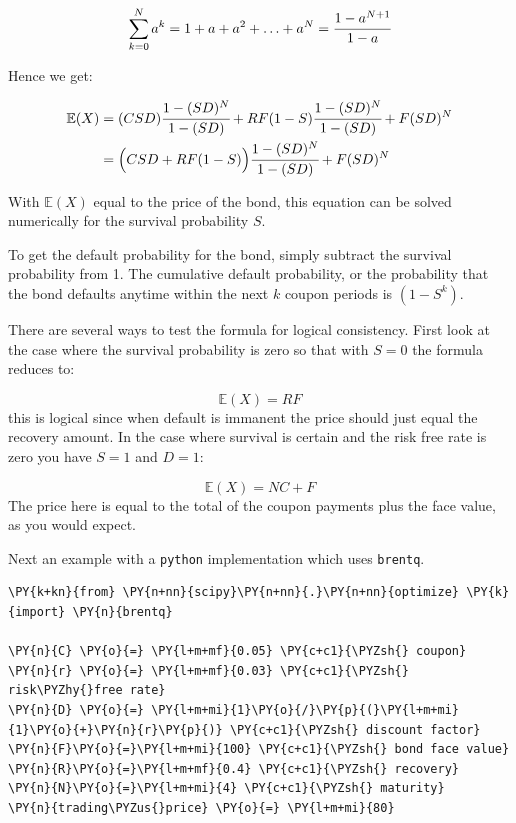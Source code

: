 \begin{attention}
\begin{equation}\sum_{k=0}^N a^k = 1 + a + a^2 + \ldots + a^N = \cfrac{1-a^{N+1}}{1-a} \end{equation}

Hence we get:

\begin{align}
\begin{split}
\mathbb{E}(X) &= (CSD) \cfrac{1-(SD)^N}{1-(SD)}+RF(1-S)\cfrac{1-(SD)^N}{1-(SD)} + F(SD)^N \\
&= \Big(CSD + RF(1-S)\Big)\cfrac{1-(SD)^N}{1-(SD)} + F(SD)^N 
\end{split}
\end{align}

With $\mathbb{E}(X)$ equal to the price of the bond, this equation can be solved numerically for the survival probability $S$.

To get the default probability for the bond, simply subtract the survival
probability from 1. The cumulative default probability, or the probability that the bond defaults anytime within the next $k$ coupon periods is $(1 - S^k)$.

There are several ways to test the formula for logical consistency. First look
at the case where the survival probability is zero so that with $S = 0$ the
formula reduces to:

\begin{equation}\mathbb{E}(X) = RF\end{equation}
this is logical since when default is immanent the price should just equal the
recovery amount.
In the case where survival is certain and the risk free rate is zero you have
$S = 1$ and $D=1$:

\begin{equation}\mathbb{E}(X) = NC + F \end{equation}
The price here is equal to the total of the coupon payments plus the face
value, as you would expect.

Next an example with a \texttt{python} implementation which uses \texttt{brentq}.

\begin{Verbatim}[commandchars=\\\{\}]
\PY{k+kn}{from} \PY{n+nn}{scipy}\PY{n+nn}{.}\PY{n+nn}{optimize} \PY{k}{import} \PY{n}{brentq}
	
\PY{n}{C} \PY{o}{=} \PY{l+m+mf}{0.05} \PY{c+c1}{\PYZsh{} coupon}
\PY{n}{r} \PY{o}{=} \PY{l+m+mf}{0.03} \PY{c+c1}{\PYZsh{} risk\PYZhy{}free rate}
\PY{n}{D} \PY{o}{=} \PY{l+m+mi}{1}\PY{o}{/}\PY{p}{(}\PY{l+m+mi}{1}\PY{o}{+}\PY{n}{r}\PY{p}{)} \PY{c+c1}{\PYZsh{} discount factor}
\PY{n}{F}\PY{o}{=}\PY{l+m+mi}{100} \PY{c+c1}{\PYZsh{} bond face value}
\PY{n}{R}\PY{o}{=}\PY{l+m+mf}{0.4} \PY{c+c1}{\PYZsh{} recovery}
\PY{n}{N}\PY{o}{=}\PY{l+m+mi}{4} \PY{c+c1}{\PYZsh{} maturity}
\PY{n}{trading\PYZus{}price} \PY{o}{=} \PY{l+m+mi}{80}
	

\end{Verbatim}
\end{attention}

